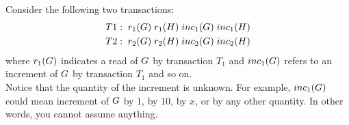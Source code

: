 

\question Consider the following two transactions:
\begin{align}
  T1:\;r_1(G)\; r_1(H)\; inc_1(G)\; inc_1(H) \nonumber \\
  T2:\;r_2(G)\; r_2(H)\; inc_2(G)\; inc_2(H) \nonumber 
\end{align}
where $r_1(G)$ indicates a read of $G$ by transaction $T_1$ and 
$inc_1(G)$ refers to an increment of $G$ by transaction $T_1$ 
and so on.\\
Notice that the quantity of the increment is unknown. For example, 
$inc_1(G)$ could mean increment of $G$ by $1$, by $10$, by $x$, 
or by any other quantity. In other words, you cannot assume anything.

